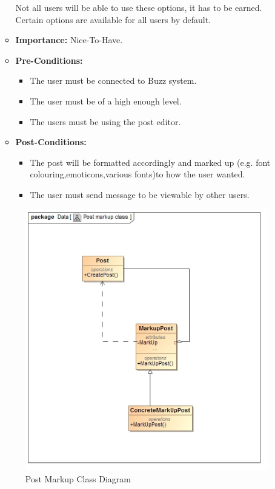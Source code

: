 \documentclass[11pt]{article}
\begin{document}
\begin{enumerate}
\begin{itemize}
Not all users will be able to use these options, it has to be earned. Certain options are available for all users by default.

 
\item\textbf{Importance:} Nice-To-Have.

 
\item\textbf{Pre-Conditions: }
	\begin{itemize}
		\item The user must be connected to Buzz system.
		\item The user must be of a high enough level.
		\item The users must be using the post editor.
	\end{itemize}
 

\item\textbf{Post-Conditions: }
	\begin{itemize}

		\item The post will be formatted accordingly and marked up (e.g. font colouring,emoticons,various fonts)to how the user wanted. 
		\item The user must send message to be viewable by other users.
	\end{itemize}
\end{itemize}
\graphicspath{ {../Diagrams/Matt/Class/} }
	  \begin{figure}[H]	
    	\includegraphics[scale=0.5]{PostmarkupClass.jpg}
    	\caption{Post Markup Class Diagram}
	\end{figure}


\end{enumerate}
\end{document}
